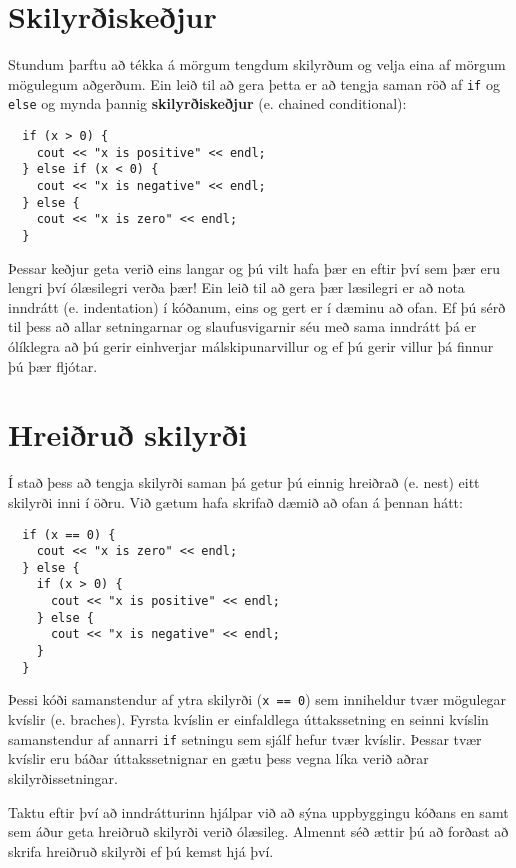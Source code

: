 \section {Skilyrðiskeðjur}

Stundum þarftu að tékka á mörgum tengdum skilyrðum og velja eina af mörgum mögulegum aðgerðum.
Ein leið til að gera þetta er að tengja saman röð af {\tt if} og {\tt else} og mynda þannig {\bf skilyrðiskeðjur} (e. chained conditional):

\begin{verbatim}
  if (x > 0) {
    cout << "x is positive" << endl;
  } else if (x < 0) {
    cout << "x is negative" << endl;
  } else {
    cout << "x is zero" << endl;
  }
\end{verbatim}
%
Þessar keðjur geta verið eins langar og þú vilt hafa þær en eftir því sem þær eru lengri því ólæsilegri verða þær!
Ein leið til að gera þær læsilegri er að nota inndrátt (e. indentation) í kóðanum, eins og gert er í dæminu að ofan.
Ef þú sérð til þess að allar setningarnar og slaufusvigarnir séu með sama inndrátt þá er ólíklegra að þú gerir einhverjar málskipunarvillur og ef þú gerir villur þá finnur þú þær fljótar.

\section{Hreiðruð skilyrði}

Í stað þess að tengja skilyrði saman þá getur þú einnig hreiðrað (e. nest) eitt skilyrði inni í öðru.
Við gætum hafa skrifað dæmið að ofan á þennan hátt:

\begin{verbatim}
  if (x == 0) {
    cout << "x is zero" << endl;
  } else {
    if (x > 0) {
      cout << "x is positive" << endl;
    } else {
      cout << "x is negative" << endl;
    }
  }
\end{verbatim}
%
Þessi kóði samanstendur af ytra skilyrði ({\tt x == 0}) sem inniheldur tvær mögulegar kvíslir (e. braches).
Fyrsta kvíslin er einfaldlega úttakssetning en seinni kvíslin samanstendur af annarri {\tt if} setningu sem sjálf hefur tvær kvíslir.
Þessar tvær kvíslir eru báðar úttakssetnignar en gætu þess vegna líka verið aðrar skilyrðissetningar.

Taktu eftir því að inndrátturinn hjálpar við að sýna uppbyggingu kóðans en samt sem áður geta hreiðruð skilyrði verið ólæsileg.
Almennt séð ættir þú að forðast að skrifa hreiðruð skilyrði ef þú kemst hjá því.


